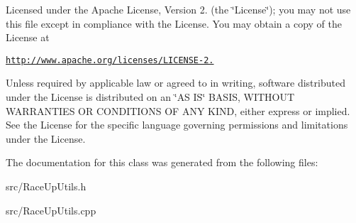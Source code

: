 Licensed under the Apache License, Version 2. (the \char`\"{}\+License\char`\"{}); you may not use this file except in compliance with the License. You may obtain a copy of the License at

\href{http://www.apache.org/licenses/LICENSE-2.0}{\tt http\+://www.\+apache.\+org/licenses/\+L\+I\+C\+E\+N\+S\+E-\/2.}

Unless required by applicable law or agreed to in writing, software distributed under the License is distributed on an \char`\"{}\+A\+S I\+S\char`\"{} B\+A\+S\+IS, W\+I\+T\+H\+O\+UT W\+A\+R\+R\+A\+N\+T\+I\+ES OR C\+O\+N\+D\+I\+T\+I\+O\+NS OF A\+NY K\+I\+ND, either express or implied. See the License for the specific language governing permissions and limitations under the License. 

The documentation for this class was generated from the following files\+:\begin{DoxyCompactItemize}
\item 
src/Race\+Up\+Utils.\+h\item 
src/Race\+Up\+Utils.\+cpp\end{DoxyCompactItemize}
